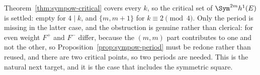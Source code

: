 \begin{remark}
  \label{rem:sympow-even-todo}
  Theorem~\ref{thm:sympow-critical} covers every $k$, so the critical set of $\Sym^{2m}h^{1}(E)$
  is settled: empty for $4 \mid k$, and $\{m,m+1\}$ for $k \equiv 2 \pmod 4$. Only the period
  is missing in the latter case, and the obstruction is genuine rather than clerical: for even
  weight $F^{+}$ and $F^{-}$ differ, because the $(m,m)$ part contributes to one and not the
  other, so Proposition~\ref{prop:sympow-period} must be redone rather than reused, and there
  are two critical points, so two periods are needed. This is the natural next target, and it
  is the case that includes the symmetric square.
\end{remark}
